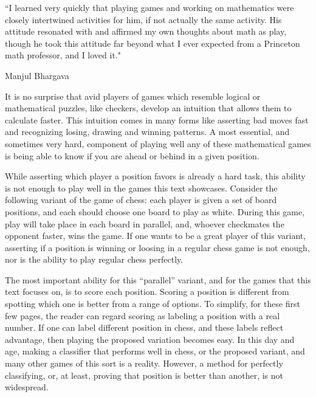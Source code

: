\renewcommand{\textflush}{flushepinormal}
\setlength{}
\epigraph{``I learned very quickly that playing games and working on mathematics were closely intertwined activities for him, if not actually the same activity. His attitude resonated with and affirmed my own thoughts about math as play, though he took this attitude far beyond what I ever expected from a Princeton math professor, and I loved it."}{Manjul Bhargava \footnotemark}




It is no surprise that avid players of games which resemble logical or
mathematical puzzles, like checkers, develop an intuition that allows
them to calculate faster. This intuition comes in many forms like
asserting bad moves fast and recognizing losing, drawing and winning
patterns. A most essential, and sometimes very hard, component of
playing well any of these mathematical games is being able to know if
you are ahead or behind in a given position.

While asserting which player a position favors is already a hard task,
this ability is not enough to play well in the games this text
showcases. Consider the following variant of the game of chess: each
player is given a set of board positions, and each should choose one
board to play as white. During this game, play will take place in each
board in parallel, and, whoever checkmates the opponent faster, wins
the game. If one wants to be a great player of this variant, asserting
if a position is winning or loosing in a regular chess game is not
enough, nor is the ability to play regular chess perfectly.

The most important ability for this ``parallel'' variant, 
and for the games that this text focuses on, is
to score each position.
Scoring a position is different from spotting which one
is better from a range of options.
To simplify, for these first few pages, the reader can
regard scoring as labeling a position with a real number.
If one can label different position in chess, and
these labels reflect advantage, 
then playing the proposed variation becomes easy.
In this day and age, making a 
classifier that performs well in chess,
or the proposed variant, and
many other games of this sort is a reality.
However, a method for perfectly classifying, or, at least, proving
that position is better than another, is not widespread.
 
